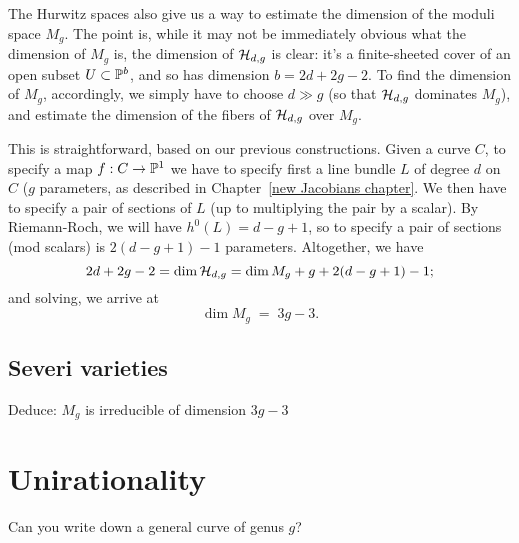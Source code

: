The Hurwitz spaces also give us a way to estimate the dimension of the moduli space $M_g$. The point is, while it may not be immediately obvious what the dimension of $M_g$ is, the dimension of $\cH_{d,g}$ is clear: it's a finite-sheeted cover of an open subset $U \subset \PP^b$, and so has dimension  $b = 2d+2g-2$. To find the dimension of $M_g$, accordingly, we simply have to choose $d \gg g$ (so that $\cH_{d,g}$ dominates $M_g$), and estimate the dimension of the fibers of $\cH_{d,g}$ over $M_g$.

This is straightforward, based on our previous constructions. Given a curve $C$, to specify a map $f : C \to \PP^1$ we have to specify first a line bundle $L$ of degree $d$ on $C$ ($g$ parameters, as described in Chapter~\ref{new Jacobians chapter}. We then have to specify a pair of sections of $L$ (up to multiplying the pair by a scalar). By Riemann-Roch, we will have $h^0(L) = d-g+1$, so to specify a pair of sections (mod scalars) is $2(d-g+1)-1$ parameters. Altogether, we have
$$
2d+2g-2 = \dim \cH_{d,g} = \dim M_g + g + 2(d-g+1)-1;
$$
and solving, we arrive at
$$
\dim M_g \; = \; 3g-3.
$$




\subsection{Severi varieties}

Deduce: $M_g$ is irreducible of dimension $3g-3$

\section{Unirationality}

Can you write down a general curve of genus $g$?

